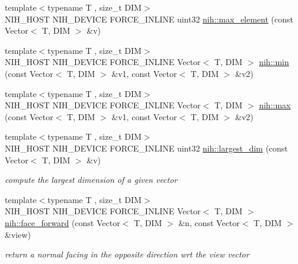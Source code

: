 \begin{DoxyCompactItemize}
\item 
{\footnotesize template$<$typename T , size\-\_\-t \-D\-I\-M$>$ }\\\-N\-I\-H\-\_\-\-H\-O\-S\-T \-N\-I\-H\-\_\-\-D\-E\-V\-I\-C\-E \*
\-F\-O\-R\-C\-E\-\_\-\-I\-N\-L\-I\-N\-E uint32 \hyperlink{group__linalg_ga549a2d3c8b77b652dc1cd56c1d119b77}{nih\-::max\-\_\-element} (const \-Vector$<$ \-T, \-D\-I\-M $>$ \&v)
\item 
{\footnotesize template$<$typename T , size\-\_\-t \-D\-I\-M$>$ }\\\-N\-I\-H\-\_\-\-H\-O\-S\-T \-N\-I\-H\-\_\-\-D\-E\-V\-I\-C\-E \*
\-F\-O\-R\-C\-E\-\_\-\-I\-N\-L\-I\-N\-E \-Vector$<$ \-T, \-D\-I\-M $>$ \hyperlink{group__linalg_ga5809911d15c32de18955c59865379695}{nih\-::min} (const \-Vector$<$ \-T, \-D\-I\-M $>$ \&v1, const \-Vector$<$ \-T, \-D\-I\-M $>$ \&v2)
\item 
{\footnotesize template$<$typename T , size\-\_\-t \-D\-I\-M$>$ }\\\-N\-I\-H\-\_\-\-H\-O\-S\-T \-N\-I\-H\-\_\-\-D\-E\-V\-I\-C\-E \*
\-F\-O\-R\-C\-E\-\_\-\-I\-N\-L\-I\-N\-E \-Vector$<$ \-T, \-D\-I\-M $>$ \hyperlink{group__linalg_gab2b34b1991185fc29890973777b60e54}{nih\-::max} (const \-Vector$<$ \-T, \-D\-I\-M $>$ \&v1, const \-Vector$<$ \-T, \-D\-I\-M $>$ \&v2)
\item 
{\footnotesize template$<$typename T , size\-\_\-t \-D\-I\-M$>$ }\\\-N\-I\-H\-\_\-\-H\-O\-S\-T \-N\-I\-H\-\_\-\-D\-E\-V\-I\-C\-E \*
\-F\-O\-R\-C\-E\-\_\-\-I\-N\-L\-I\-N\-E uint32 \hyperlink{group__linalg_ga22cda565844e9049dd1438a376c2e198}{nih\-::largest\-\_\-dim} (const \-Vector$<$ \-T, \-D\-I\-M $>$ \&v)
\begin{DoxyCompactList}\small\item\em compute the largest dimension of a given vector \end{DoxyCompactList}\item 
{\footnotesize template$<$typename T , size\-\_\-t \-D\-I\-M$>$ }\\\-N\-I\-H\-\_\-\-H\-O\-S\-T \-N\-I\-H\-\_\-\-D\-E\-V\-I\-C\-E \*
\-F\-O\-R\-C\-E\-\_\-\-I\-N\-L\-I\-N\-E \-Vector$<$ \-T, \-D\-I\-M $>$ \hyperlink{group__linalg_ga396a9bd50b2cf3f00afd4f806ce544f3}{nih\-::face\-\_\-forward} (const \-Vector$<$ \-T, \-D\-I\-M $>$ \&n, const \-Vector$<$ \-T, \-D\-I\-M $>$ \&view)
\begin{DoxyCompactList}\small\item\em return a normal facing in the opposite direction wrt the view vector \end{DoxyCompactList}\item 

\end{DoxyCompactItemize}
